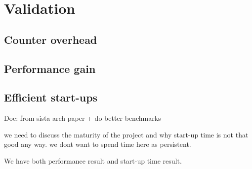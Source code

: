 \documentclass[a4paper,12pt,twoside]{../includes/ThesisStyle}
\begin{document}
\fi

\chapter{Validation}
\label{chap:validation}
\minitoc

\section{Counter overhead}

\section{Performance gain}

\section{Efficient start-ups}

Doc: from sista arch paper + do better benchmarks

we need to discuss the maturity of the project and why start-up time is not that good any way. we dont want to spend time here as persistent.

We have both performance result and start-up time result.


\ifx\wholebook\relax\else
    
\end{document}
